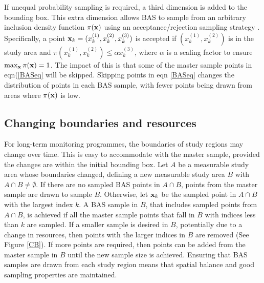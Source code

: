 \documentclass[titlepage]{article}
\begin{document}
If unequal probability sampling is required, a third dimension is added to the bounding box. This extra dimension allows BAS to sample from an arbitrary inclusion density function $\pi(\bf{x})$ using an acceptance/rejection sampling strategy \citep{Robertson2013}. Specifically, a point ${\bf x}_k = (x_k^{(1)}, x_k^{(2)}, x_k^{(3)})$ is accepted if $(x_k^{(1)}, x_k^{(2)})$ is in the study area and $\pi(x_k^{(1)}, x_k^{(2)}) \leq \alpha x_k^{(3)}$, where $\alpha$ is a scaling factor to ensure $\max_{{\bf x}}\pi({\bf x}) = 1$. The impact of this is that some of the master sample points in eqn(\ref{BASeq} will be skipped. Skipping points in eqn \ref{BASeq} changes the distribution of points in each BAS sample, with fewer points being drawn from areas where $\pi({\bf{x}})$ is low.

\subsection{Changing boundaries and resources}
For long-term monitoring programmes, the boundaries of study regions may change over time. This is easy to accommodate with the master sample, provided the changes are within the initial bounding box. Let $A$ be a measurable study area whose boundaries changed, defining a new measurable study area $B$ with $A \cap B \neq \emptyset$. If there are no sampled BAS points in $A \cap B$, points from the master sample are drawn to sample $B$. Otherwise, let ${\bf x}_k$ be the sampled point in $A \cap B$ with the largest index $k$. A BAS sample in $B$, that includes sampled points from $A \cap B$, is achieved if all the master sample points that fall in $B$ with indices less than $k$ are sampled. If a smaller sample is desired in $B$, potentially due to a change in resources, then points with the larger indices in $B$ are removed (See Figure \ref{CB}). If more points are required, then points can be added from the master sample in $B$ until the new sample size is achieved. Ensuring that BAS samples are drawn from each study region means that spatial balance and good sampling properties are maintained.
\end{document}

